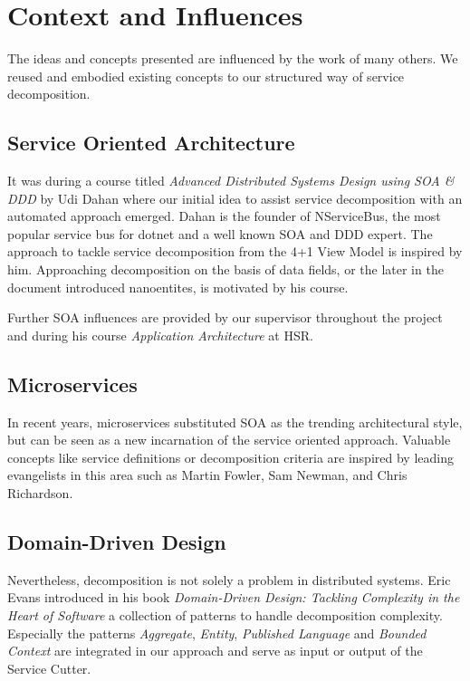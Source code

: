 \section{Context and Influences}

The ideas and concepts presented are influenced by the work of many others. We reused and embodied existing concepts to our structured way of service decomposition. 

\subsection{Service Oriented Architecture}

It was during a course titled \textit{Advanced Distributed Systems Design using SOA \& DDD} by Udi Dahan where our initial idea to assist service decomposition with an automated approach emerged. Dahan is the founder of NServiceBus\cite{nservicebus}, the most popular service bus for \gls{dotnet} and a well known \gls{SOA} and \gls{DDD} expert. The approach to tackle service decomposition from the 4+1 View Model\cite{fourPlusOne} is inspired by him. Approaching decomposition on the basis of data fields, or the later in the document introduced nanoentites, is motivated by his course.

Further \gls{SOA} influences are provided by our supervisor throughout the project and during his course \textit{Application Architecture} at \gls{HSR}.

\subsection{Microservices}

In recent years, microservices substituted \gls{SOA} as the trending architectural style, but can be seen as a new incarnation of the service oriented approach. Valuable concepts like service definitions or decomposition criteria are inspired by leading evangelists in this area such as Martin Fowler, Sam Newman, and Chris Richardson. 

\subsection{Domain-Driven Design}

Nevertheless, decomposition is not solely a problem in distributed systems. Eric Evans introduced in his book \textit{Domain-Driven Design: Tackling Complexity in the Heart of Software}\cite{evans2003domain} a collection of patterns to handle decomposition complexity. Especially the patterns \textit{Aggregate}, \textit{Entity}, \textit{Published Language} and \textit{Bounded Context} are integrated in our approach and serve as input or output of the Service Cutter.

